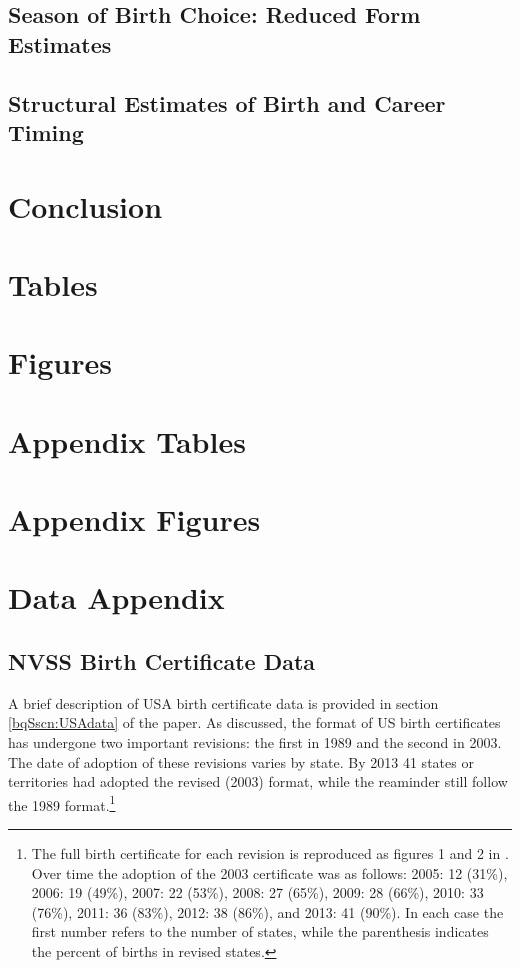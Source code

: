 \documentclass[a4paper, 11 pt]{article}
\theoremstyle{plain}
\begin{document}
\begin{spacing}{1.4}
\subsection{Season of Birth Choice: Reduced Form Estimates}

\subsection{Structural Estimates of Birth and Career Timing}




\section{Conclusion}

\newpage





\newpage
\section*{Tables}


\newpage
\section*{Figures}


\clearpage
\appendix
\section{Appendix Tables}


\clearpage
\appendix
\section{Appendix Figures}



\section{Data Appendix}
\label{bqScn:datApp}
\subsection{NVSS Birth Certificate Data}
A brief description of USA birth certificate data is provided in section 
\ref{bqSscn:USAdata} of the paper.  As discussed, the format of US birth
certificates has undergone two important revisions: the first in 1989
and the second in 2003.  The date of adoption of these revisions varies 
by state.  By 2013 41 states or territories had adopted the revised (2003)
format, while the reaminder still follow the 1989 format.\footnote{The full
birth certificate for each revision is reproduced as figures 1 and 2 in
\citet{MenackerMartin2005}.  Over time the adoption of the 2003 certificate 
was as follows: 2005: 12 (31\%), 2006: 19 (49\%), 2007: 22 (53\%), 2008: 27 
(65\%), 2009: 28 (66\%), 2010: 33 (76\%), 2011: 36 (83\%), 2012: 38 (86\%),
and 2013: 41 (90\%).  In each case the first number refers to the number
of states, while the parenthesis indicates the percent of births in revised
states.}


\end{spacing}
\end{document}
